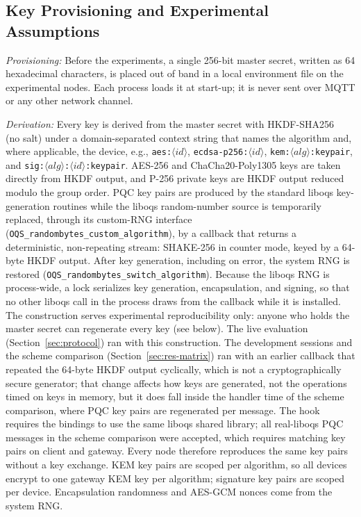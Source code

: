 \documentclass[journal]{IEEEtran}
\begin{document}
\subsection{Key Provisioning and Experimental Assumptions}
\label{sec:keys}

\textit{Provisioning:} Before the experiments, a single 256-bit master secret, written as 64 hexadecimal characters, is placed out of band in a local environment file on the experimental nodes. Each process loads it at start-up; it is never sent over MQTT or any other network channel.

\textit{Derivation:} Every key is derived from the master secret with HKDF-SHA256~\cite{rfc5869} (no salt) under a domain-separated context string that names the algorithm and, where applicable, the device, e.g., \texttt{aes:}$\langle id\rangle$, \texttt{ecdsa-p256:}$\langle id\rangle$, \texttt{kem:}$\langle alg\rangle$\texttt{:keypair}, and \texttt{sig:}$\langle alg\rangle$\texttt{:}$\langle id\rangle$\texttt{:keypair}. AES-256 and ChaCha20-Poly1305 keys are taken directly from HKDF output, and P-256 private keys are HKDF output reduced modulo the group order. PQC key pairs are produced by the standard liboqs key-generation routines while the liboqs random-number source is temporarily replaced, through its custom-RNG interface (\texttt{OQS\_randombytes\_custom\_algorithm}), by a callback that returns a deterministic, non-repeating stream: SHAKE-256 in counter mode, keyed by a 64-byte HKDF output. After key generation, including on error, the system RNG is restored (\texttt{OQS\_randombytes\_switch\_algorithm}). Because the liboqs RNG is process-wide, a lock serializes key generation, encapsulation, and signing, so that no other liboqs call in the process draws from the callback while it is installed. The construction serves experimental reproducibility only: anyone who holds the master secret can regenerate every key (see below). The live evaluation (Section~\ref{sec:protocol}) ran with this construction. The development sessions and the scheme comparison (Section~\ref{sec:res-matrix}) ran with an earlier callback that repeated the 64-byte HKDF output cyclically, which is not a cryptographically secure generator; that change affects how keys are generated, not the operations timed on keys in memory, but it does fall inside the handler time of the scheme comparison, where PQC key pairs are regenerated per message. The hook requires the bindings to use the same liboqs shared library; all real-liboqs PQC messages in the scheme comparison were accepted, which requires matching key pairs on client and gateway. Every node therefore reproduces the same key pairs without a key exchange. KEM key pairs are scoped per algorithm, so all devices encrypt to one gateway KEM key per algorithm; signature key pairs are scoped per device. Encapsulation randomness and AES-GCM nonces come from the system RNG.
\end{document}
